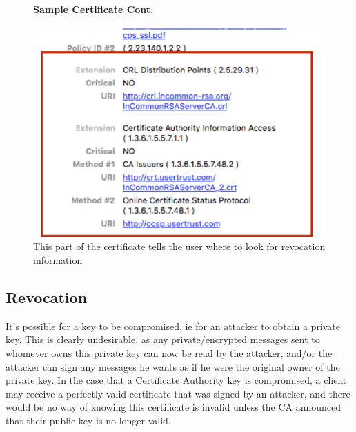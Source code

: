 \documentclass[11pt]{article} %
\begin{document}
\begin{figure}[H]
    \centering
    \textbf{Sample Certificate Cont.}\par\medskip
    \includegraphics[scale=.5]{./cert2.png}
    \caption{This part of the certificate tells the user where to look for revocation information}
\end{figure}


\subsection{Revocation}
It's possible for a key to be compromised, ie for an attacker to obtain a private key. This is clearly undesirable, as any private/encrypted messages sent to whomever owns this private key can now be read by the attacker, and/or the attacker can sign any messages he wants as if he were the original owner of the private key. In the case that a Certificate Authority key is compromised, a client may receive a perfectly valid certificate that was signed by an attacker, and there would be no way of knowing this certificate is invalid unless the CA announced that their public key is no longer valid.
\end{document}
